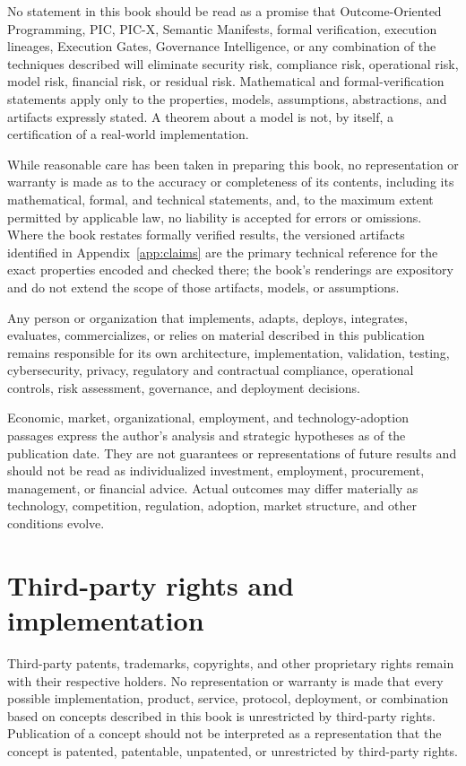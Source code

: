 \documentclass[10pt,oneside,openany]{book}
\begin{document}
No statement in this book should be read as a promise that Outcome-Oriented Programming, PIC, PIC-X, Semantic Manifests, formal verification, execution lineages, Execution Gates, Governance Intelligence, or any combination of the techniques described will eliminate security risk, compliance risk, operational risk, model risk, financial risk, or residual risk. Mathematical and formal-verification statements apply only to the properties, models, assumptions, abstractions, and artifacts expressly stated. A theorem about a model is not, by itself, a certification of a real-world implementation.

While reasonable care has been taken in preparing this book, no representation or warranty is made as to the accuracy or completeness of its contents, including its mathematical, formal, and technical statements, and, to the maximum extent permitted by applicable law, no liability is accepted for errors or omissions. Where the book restates formally verified results, the versioned artifacts identified in Appendix~\ref{app:claims} are the primary technical reference for the exact properties encoded and checked there; the book's renderings are expository and do not extend the scope of those artifacts, models, or assumptions.

Any person or organization that implements, adapts, deploys, integrates, evaluates, commercializes, or relies on material described in this publication remains responsible for its own architecture, implementation, validation, testing, cybersecurity, privacy, regulatory and contractual compliance, operational controls, risk assessment, governance, and deployment decisions.

Economic, market, organizational, employment, and technology-adoption passages express the author's analysis and strategic hypotheses as of the publication date. They are not guarantees or representations of future results and should not be read as individualized investment, employment, procurement, management, or financial advice. Actual outcomes may differ materially as technology, competition, regulation, adoption, market structure, and other conditions evolve.

\section{Third-party rights and implementation}
Third-party patents, trademarks, copyrights, and other proprietary rights remain with their respective holders. No representation or warranty is made that every possible implementation, product, service, protocol, deployment, or combination based on concepts described in this book is unrestricted by third-party rights. Publication of a concept should not be interpreted as a representation that the concept is patented, patentable, unpatented, or unrestricted by third-party rights.
\end{document}
